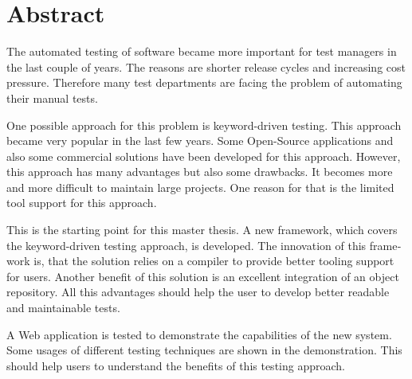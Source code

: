 \chapter{Abstract}

\begin{english} %

The automated testing of software became more important for test managers in the last couple of years. The reasons are shorter release cycles and increasing cost pressure. Therefore many test departments are facing the problem of automating their manual tests.

\SuperPar
One possible approach for this problem is keyword-driven testing. This approach became very popular in the last few years. Some Open-Source applications and also some commercial solutions have been developed for this approach. However, this approach has many advantages but also some drawbacks. It becomes more and more difficult to maintain large projects. One reason for that is the limited tool support for this approach.

\SuperPar
This is the starting point for this master thesis. A new framework, which covers the keyword-driven testing approach, is developed. The innovation of this framework is, that the solution relies on a compiler to provide better tooling support for users. Another benefit of this solution is an excellent integration of an object repository. All this advantages should help the user to develop better readable and maintainable tests.

\SuperPar
A Web application is tested to demonstrate the capabilities of the new system. Some usages of different testing techniques are shown in the demonstration. This should help users to understand the benefits of this testing approach.

\end{english}
